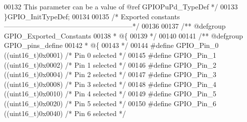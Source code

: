 \begin{DoxyCode}
00132 \textcolor{comment}{                                       This parameter can be a value of @ref GPIOPuPd\_TypeDef */}
00133 \}GPIO\_InitTypeDef;
00134 
00135 \textcolor{comment}{/* Exported constants --------------------------------------------------------*/}
00136 
00137 \textcolor{comment}{/** @defgroup GPIO\_Exported\_Constants}
00138 \textcolor{comment}{  * @\{}
00139 \textcolor{comment}{  */}
00140 
00141 \textcolor{comment}{/** @defgroup GPIO\_pins\_define }
00142 \textcolor{comment}{  * @\{}
00143 \textcolor{comment}{  */}
00144 \textcolor{preprocessor}{#}\textcolor{preprocessor}{define} \textcolor{preprocessor}{GPIO\_Pin\_0}                 \textcolor{preprocessor}{(}\textcolor{preprocessor}{(}\textcolor{preprocessor}{uint16\_t}\textcolor{preprocessor}{)}0x0001\textcolor{preprocessor}{)}  \textcolor{comment}{/* Pin 0 selected */}
00145 \textcolor{preprocessor}{#}\textcolor{preprocessor}{define} \textcolor{preprocessor}{GPIO\_Pin\_1}                 \textcolor{preprocessor}{(}\textcolor{preprocessor}{(}\textcolor{preprocessor}{uint16\_t}\textcolor{preprocessor}{)}0x0002\textcolor{preprocessor}{)}  \textcolor{comment}{/* Pin 1 selected */}
00146 \textcolor{preprocessor}{#}\textcolor{preprocessor}{define} \textcolor{preprocessor}{GPIO\_Pin\_2}                 \textcolor{preprocessor}{(}\textcolor{preprocessor}{(}\textcolor{preprocessor}{uint16\_t}\textcolor{preprocessor}{)}0x0004\textcolor{preprocessor}{)}  \textcolor{comment}{/* Pin 2 selected */}
00147 \textcolor{preprocessor}{#}\textcolor{preprocessor}{define} \textcolor{preprocessor}{GPIO\_Pin\_3}                 \textcolor{preprocessor}{(}\textcolor{preprocessor}{(}\textcolor{preprocessor}{uint16\_t}\textcolor{preprocessor}{)}0x0008\textcolor{preprocessor}{)}  \textcolor{comment}{/* Pin 3 selected */}
00148 \textcolor{preprocessor}{#}\textcolor{preprocessor}{define} \textcolor{preprocessor}{GPIO\_Pin\_4}                 \textcolor{preprocessor}{(}\textcolor{preprocessor}{(}\textcolor{preprocessor}{uint16\_t}\textcolor{preprocessor}{)}0x0010\textcolor{preprocessor}{)}  \textcolor{comment}{/* Pin 4 selected */}
00149 \textcolor{preprocessor}{#}\textcolor{preprocessor}{define} \textcolor{preprocessor}{GPIO\_Pin\_5}                 \textcolor{preprocessor}{(}\textcolor{preprocessor}{(}\textcolor{preprocessor}{uint16\_t}\textcolor{preprocessor}{)}0x0020\textcolor{preprocessor}{)}  \textcolor{comment}{/* Pin 5 selected */}
00150 \textcolor{preprocessor}{#}\textcolor{preprocessor}{define} \textcolor{preprocessor}{GPIO\_Pin\_6}                 \textcolor{preprocessor}{(}\textcolor{preprocessor}{(}\textcolor{preprocessor}{uint16\_t}\textcolor{preprocessor}{)}0x0040\textcolor{preprocessor}{)}  \textcolor{comment}{/* Pin 6 selected */}

\end{DoxyCode}
